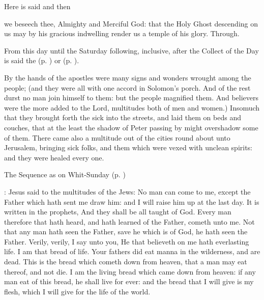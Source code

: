 \begin{rubric}
	Here is said  and then 
\end{rubric}

\collect
{} we beseech thee, Almighty and Merciful God: that the Holy Ghost descending on us may by his gracious indwelling render us a temple of his glory. Through.

\begin{rubric}
    From this day until the Saturday following, inclusive, after the Collect of the Day is said the   (p. \pageref{SPAgainst}) or  (p. \pageref{SPChiefBishop}).
\end{rubric}

 By the hands of the apostles were many signs and wonders wrought among the people; (and they were all with one accord in Solomon's porch. And of the rest durst no man join himself to them: but the people magnified them. And believers were the more added to the Lord, multitudes both of men and women.) Insomuch that they brought forth the sick into the streets, and laid them on beds and couches, that at the least the shadow of Peter passing by might overshadow some of them. There came also a multitude out of the cities round about unto Jerusalem, bringing sick folks, and them which were vexed with unclean spirits: and they were healed every one.


\begin{rubric}
{The Sequence as on Whit-Sunday (p. \pageref{WhitSeq})}
\end{rubric}

: Jesus said to the multitudes of the Jews: No man can come to me, except the Father which hath sent me draw him: and I will raise him up at the last day. It is written in the prophets, And they shall be all taught of God. Every man therefore that hath heard, and hath learned of the Father, cometh unto me. Not that any man hath seen the Father, save he which is of God, he hath seen the Father. Verily, verily, I say unto you, He that believeth on me hath everlasting life. I am that bread of life. Your fathers did eat manna in the wilderness, and are dead. This is the bread which cometh down from heaven, that a man may eat thereof, and not die. I am the living bread which came down from heaven: if any man eat of this bread, he shall live for ever: and the bread that I will give is my flesh, which I will give for the life of the world.

